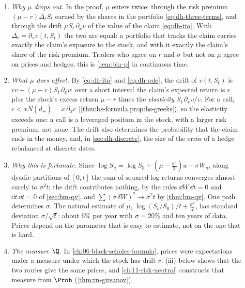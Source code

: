 \begin{remark}\label{rem:dh-mu}
\begin{enumerate}[label=(\alph*),leftmargin=*]
  \item \emph{Why $\mu$ drops out.} In the proof, $\mu$ enters twice: through the risk premium
    $(\mu-r)\Delta_tS_t$ earned by the shares in the portfolio \eqref{eq:dh-three-terms}, and
    through the drift $\mu S_t\,\partial_xv$ of the value of the claim \eqref{eq:dh-ito}. With
    $\Delta_t=\partial_xv(t,S_t)$ the two are equal: a portfolio that tracks the claim carries
    exactly the claim's exposure to the stock, and with it exactly the claim's share of the
    risk premium. Traders who agree on $r$ and $\sigma$ but not on $\mu$ agree on prices and
    hedges; this is \cref{rem:bin-p} in continuous time.
  \item \emph{What $\mu$ does affect.} By \eqref{eq:dh-ito} and \eqref{eq:dh-pde}, the drift of
    $v(t,S_t)$ is $rv+(\mu-r)S_t\,\partial_xv$: over a short interval the claim's expected
    return is $r$ plus the stock's excess return $\mu-r$ times the \emph{elasticity}
    $S_t\,\partial_xv/v$. For a call, $c<xN(d_+)=x\,\partial_xc$ (\cref{thm:bs-formula,prop:bs-greeks}),
    so the elasticity exceeds one: a call is a leveraged position in the stock, with a larger
    risk premium, not none. The drift also determines the probability that the claim ends
    in the money, and, in \cref{sec:dh-discrete}, the size of the error of a hedge
    rebalanced at discrete dates.
  \item \emph{Why this is fortunate.} Since $\log S_u=\log S_0+(\mu-\frac{\sigma^2}{2})u+\sigma W_u$, along
    dyadic partitions of $[0,t]$ the sum of squared log-returns converges almost surely to
    $\sigma^2t$: the drift contributes nothing, by the rules $\dd W\,\dd t=0$ and
    $\dd t\,\dd t=0$ of \cref{sec:bm-qv}, and $\sum(\sigma\,\delta W)^2\to\sigma^2t$ by
    \cref{thm:bm-qv}. One path determines $\sigma$. The natural estimate of $\mu$,
    $\log(S_t/S_0)/t+\frac{\sigma^2}{2}$, has standard deviation $\sigma/\sqrt t$: about
    $6\%$ per year with $\sigma=20\%$ and ten years of data. Prices depend on the parameter
    that is easy to estimate, not on the one that is hard.
  \item \emph{The measure $\Q$.} In \cref{ch:06-black-scholes-formula}, prices were expectations
    under a measure under which the stock has drift $r$. (iii)
    below shows that the two routes give the same prices, and \cref{ch:11-risk-neutral}
    constructs that measure from $\Prob$ (\cref{thm:rn-girsanov}).
\end{enumerate}
\end{remark}

